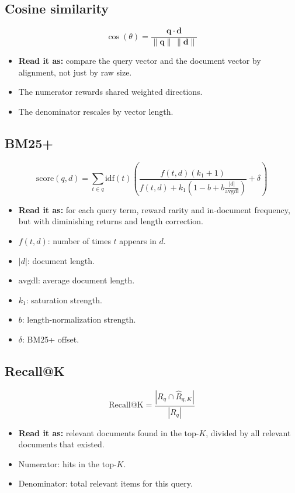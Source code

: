 \documentclass[10pt]{article}
\newcommand{\vect}[1]{\mathbf{#1}}
\begin{document}
\subsection*{Cosine similarity}
\[
\cos(\theta)=\frac{\vect{q}\cdot\vect{d}}{\|\vect{q}\|\,\|\vect{d}\|}
\]
\begin{itemize}
    \item \textbf{Read it as:} compare the query vector and the document vector by alignment, not just by raw size.
    \item The numerator rewards shared weighted directions.
    \item The denominator rescales by vector length.
\end{itemize}

\subsection*{BM25+}
\[
\mathrm{score}(q,d) = \sum_{t\in q} \mathrm{idf}(t)
\left(
\frac{f(t,d)(k_1+1)}{f(t,d)+k_1\left(1-b+b\frac{|d|}{\mathrm{avgdl}}\right)} + \delta
\right)
\]
\begin{itemize}
    \item \textbf{Read it as:} for each query term, reward rarity and in-document frequency, but with diminishing returns and length correction.
    \item \(f(t,d)\): number of times \(t\) appears in \(d\).
    \item \(|d|\): document length.
    \item \(\mathrm{avgdl}\): average document length.
    \item \(k_1\): saturation strength.
    \item \(b\): length-normalization strength.
    \item \(\delta\): BM25+ offset.
\end{itemize}

\subsection*{Recall@K}
\[
\mathrm{Recall@K}=\frac{|R_q\cap\hat{R}_{q,K}|}{|R_q|}
\]
\begin{itemize}
    \item \textbf{Read it as:} relevant documents found in the top-\(K\), divided by all relevant documents that existed.
    \item Numerator: hits in the top-\(K\).
    \item Denominator: total relevant items for this query.
\end{itemize}
\end{document}
